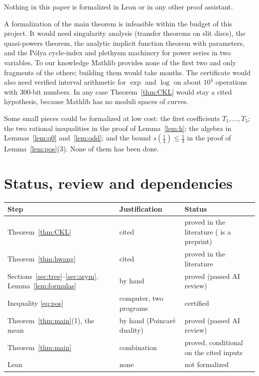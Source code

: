 \documentclass[11pt]{amsart}
\theoremstyle{definition}
\theoremstyle{remark}
\numberwithin{equation}{section}
\begin{document}
Nothing in this paper is formalized in Lean or in any other proof assistant.

A formalization of the main theorem is infeasible within the budget of this project. It would need singularity analysis (transfer theorems on slit discs), the quasi-powers theorem, the analytic implicit function theorem with parameters, and the P\'olya cycle-index and plethysm machinery for power series in two variables. To our knowledge Mathlib provides none of the first two and only fragments of the others; building them would take months. The certificate would also need verified interval arithmetic for \(\exp\) and \(\log\) on about \(10^4\) operations with 300-bit numbers. In any case Theorem~\ref{thm:CKL} would stay a cited hypothesis, because Mathlib has no moduli spaces of curves.

Some small pieces could be formalized at low cost: the first coefficients \(T_1,\dots,T_5\); the two rational inequalities in the proof of Lemma~\ref{lem:h}; the algebra in Lemmas~\ref{lem:q0} and~\ref{lem:odd}; and the bound \(s(\frac14)\le\frac13\) in the proof of Lemma~\ref{lem:pos}(3). None of them has been done.

\section{Status, review and dependencies}\label{sec:status}

\begin{center}
\small
\setlength{\tabcolsep}{4pt}
\begin{tabular}{p{}p{}p{}}
\toprule
Step & Justification & Status \\
\midrule
Theorem~\ref{thm:CKL} & cited \cite{CKL,CK} & proved in the literature (\cite{CKL} is a preprint) \\
Theorem~\ref{thm:hwang} & cited \cite{Hw,FS} & proved in the literature \\
Sections~\ref{sec:tree}--\ref{sec:asym}, Lemma~\ref{lem:formulas} & by hand & proved (passed AI review) \\
Inequality \eqref{eq:pos} & computer, two programs & certified \\
Theorem~\ref{thm:main}(1), the mean & by hand (Poincar\'e duality) & proved (passed AI review) \\
Theorem~\ref{thm:main} & combination & proved, conditional on the cited inputs \\
Lean & none & not formalized \\
\bottomrule
\end{tabular}
\end{center}
\end{document}
